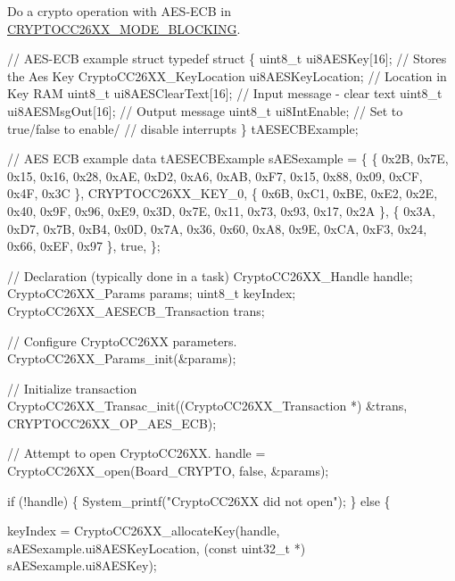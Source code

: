 Do a crypto operation with A\+E\+S-\/\+E\+C\+B in \hyperlink{_crypto_c_c26_x_x_8h_abf86c8ac428559f00fed3299d439e2cdaf0a9faf35a12d014c5f3a475906a3373}{C\+R\+Y\+P\+T\+O\+C\+C26\+X\+X\+\_\+\+M\+O\+D\+E\+\_\+\+B\+L\+O\+C\+K\+I\+N\+G}. 
\begin{DoxyCode}
\textcolor{comment}{// AES-ECB example struct}
\textcolor{keyword}{typedef} \textcolor{keyword}{struct}
\{
    uint8\_t ui8AESKey[16];                      \textcolor{comment}{// Stores the Aes Key}
    CryptoCC26XX_KeyLocation ui8AESKeyLocation; \textcolor{comment}{// Location in Key RAM}
    uint8\_t ui8AESClearText[16];                \textcolor{comment}{// Input message - clear text}
    uint8\_t ui8AESMsgOut[16];                   \textcolor{comment}{// Output message}
    uint8\_t ui8IntEnable;                       \textcolor{comment}{// Set to true/false to enable/}
                                                \textcolor{comment}{// disable interrupts}
\} tAESECBExample;

\textcolor{comment}{// AES ECB example data}
tAESECBExample sAESexample =
\{
    \{ 0x2B, 0x7E, 0x15, 0x16, 0x28, 0xAE, 0xD2, 0xA6,
    0xAB, 0xF7, 0x15, 0x88, 0x09, 0xCF, 0x4F, 0x3C \},
    CRYPTOCC26XX_KEY_0,
    \{ 0x6B, 0xC1, 0xBE, 0xE2, 0x2E, 0x40, 0x9F, 0x96,
    0xE9, 0x3D, 0x7E, 0x11, 0x73, 0x93, 0x17, 0x2A \},
    \{ 0x3A, 0xD7, 0x7B, 0xB4, 0x0D, 0x7A, 0x36, 0x60,
    0xA8, 0x9E, 0xCA, 0xF3, 0x24, 0x66, 0xEF, 0x97 \},
    \textcolor{keyword}{true},
\};

\textcolor{comment}{// Declaration (typically done in a task)}
CryptoCC26XX_Handle             handle;
CryptoCC26XX_Params             params;
uint8\_t                         keyIndex;
CryptoCC26XX_AESECB_Transaction trans;

\textcolor{comment}{// Configure CryptoCC26XX parameters.}
CryptoCC26XX_Params_init(&params);

\textcolor{comment}{// Initialize transaction}
CryptoCC26XX_Transac_init((CryptoCC26XX_Transaction *) &trans, 
      CRYPTOCC26XX_OP_AES_ECB);

\textcolor{comment}{// Attempt to open CryptoCC26XX.}
handle = CryptoCC26XX_open(Board\_CRYPTO, \textcolor{keyword}{false}, &params);

\textcolor{keywordflow}{if} (!handle) \{
    System\_printf(\textcolor{stringliteral}{"CryptoCC26XX did not open"});
\} \textcolor{keywordflow}{else} \{

    keyIndex = CryptoCC26XX_allocateKey(handle, sAESexample.ui8AESKeyLocation,
                                         (\textcolor{keyword}{const} uint32\_t *) sAESexample.ui8AESKey);


\end{DoxyCode}
